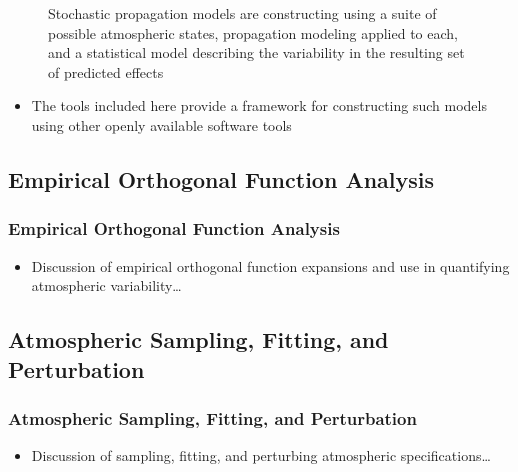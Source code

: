 \documentclass[letterpaper,10pt,english]{sphinxmanual}
\let\sphinxpxdimen\pdfpxdimen\else\newdimen\sphinxpxdimen
\begin{document}
\begin{figure}[htbp]
\centering
\capstart

\noindent\sphinxincludegraphics[width=500\sphinxpxdimen]{{stochprop_fig1}.jpg}
\caption{Stochastic propagation models are constructing using a suite of possible atmospheric states, propagation modeling applied to each, and a statistical model describing the variability in the resulting set of predicted effects}\label{\detokenize{analysis:id1}}\end{figure}
\begin{itemize}
\item {} 
The tools included here provide a framework for constructing such models using other openly available software tools

\end{itemize}


\subsection{Empirical Orthogonal Function Analysis}
\label{\detokenize{analysis:empirical-orthogonal-function-analysis}}

\subsubsection{Empirical Orthogonal Function Analysis}
\label{\detokenize{analysis:eofs}}\begin{itemize}
\item {} 
Discussion of empirical orthogonal function expansions and use in quantifying atmospheric variability…

\end{itemize}


\subsection{Atmospheric Sampling, Fitting, and Perturbation}
\label{\detokenize{analysis:atmospheric-sampling-fitting-and-perturbation}}

\subsubsection{Atmospheric Sampling, Fitting, and Perturbation}
\label{\detokenize{analysis:sampling}}\begin{itemize}
\item {} 
Discussion of sampling, fitting, and perturbing atmospheric specifications…

\end{itemize}
\end{document}
